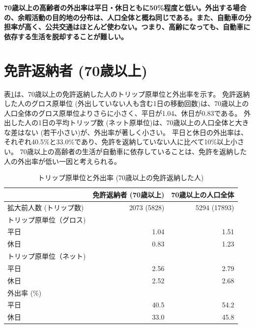 \documentclass[a4paper,12pt, uplatex]{jsbook}
\begin{document}
\color{red}
\begin{framed}
\noindent
\textbf{\large 70歳以上の高齢者の外出率は平日・休日ともに50\%程度と低い。外出する場合の、余暇活動の目的地の分布は、人口全体と概ね同じである。また、自動車の分担率が高く、公共交通はほとんど使わない。つまり、高齢になっても、自動車に依存する生活を脱却することが難しい。}
\end{framed}
\color{black}



\clearpage
\section{免許返納者 (70歳以上)}

表\ref{tab:トリップ_外出率_返納}は、70歳以上の免許返納した人のトリップ原単位と外出率を示す。
免許返納した人のグロス原単位 (外出していない人も含む1日の移動回数)は、70歳以上の人口全体のグロス原単位よりさらに小さく、平日が1.04、休日が0.83である。
外出した人の1日の平均トリップ数 (ネット原単位)は、70歳以上の人口全体と大きな差はない (若干小さい)が、外出率が著しく小さい。
平日と休日の外出率は、それぞれ40.5\%と33.0\%であり、免許を返納していない人に比べて10\%以上小さい。
70歳以上の高齢者の生活が自動車に依存していることは、免許を返納した人の外出率が低い一因と考えられる。
%
\begin{table}[htbp]
\centering
\caption{トリップ原単位と外出率 (70歳以上の免許返納した人)}
\label{tab:トリップ_外出率_返納}
\begin{tabular}{lrr}
\toprule
& 免許返納者 (70歳以上) & 70歳以上の人口全体 \\
\midrule
拡大前人数 (トリップ数) & 2073 (5828) & 5294 (17893)\\
トリップ原単位（グロス) & & \\
\hspace{2em} 平日 & 1.04 & 1.51 \\
\hspace{2em} 休日 & 0.83 & 1.23 \\
トリップ原単位（ネット) & & \\
\hspace{2em} 平日 & 2.56 & 2.79 \\
\hspace{2em} 休日 & 2.52 & 2.68\\
外出率 (\%) & & \\
\hspace{2em} 平日 & 40.5 & 54.2\\
\hspace{2em} 休日 & 33.0 & 45.8\\
\bottomrule
\end{tabular}
\end{table}
\end{document}
